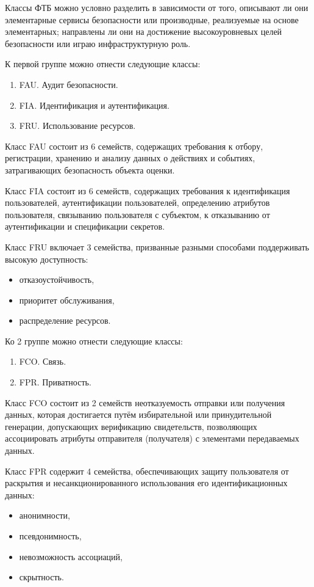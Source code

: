 \documentclass[12pt, russian, oneside, article]{ncc}
\begin{document}
Классы ФТБ можно условно разделить в зависимости от того, описывают ли они элементарные сервисы безопасности или производные, реализуемые на основе элементарных; направлены ли они на достижение высокоуровневых целей безопасности или играю  инфраструктурную роль.

К первой группе можно отнести следующие классы:
\begin{enumerate}
\item FAU. Аудит безопасности.
\item FIA. Идентификация и аутентификация.
\item FRU. Использование ресурсов.
\end{enumerate}

Класс FAU состоит из 6 семейств, содержащих требования к отбору, регистрации, хранению и анализу данных о действиях и событиях, затрагивающих безопасность объекта оценки.

Класс FIA состоит из 6 семейств, содержащих требования к идентификация пользователей, аутентификации пользователей, определению атрибутов пользователя, связыванию пользователя с субъектом, к отказыванию от аутентификации и спецификации секретов.

Класс FRU включает 3 семейства, призванные разными способами поддерживать высокую доступность:
\begin{itemize}
\item отказоустойчивость,
\item приоритет обслуживания,
\item распределение ресурсов.
\end{itemize}

Ко 2 группе можно отнести следующие классы:
\begin{enumerate}
\item FCO. Связь.
\item FPR. Приватность.
\end{enumerate}

Класс FCO состоит из 2 семейств неотказуемость отправки или получения данных, которая достигается путём избирательной или принудительной генерации, допускающих верификацию свидетельств, позволяющих ассоциировать атрибуты отправителя (получателя) с элементами передаваемых данных.

Класс FPR содержит 4 семейства, обеспечивающих защиту пользователя от раскрытия и несанкционированного использования его идентификационных данных:
\begin{itemize}
\item анонимности,
\item псевдонимность,
\item невозможность ассоциаций,
\item скрытность.
\end{itemize}
\end{document}
